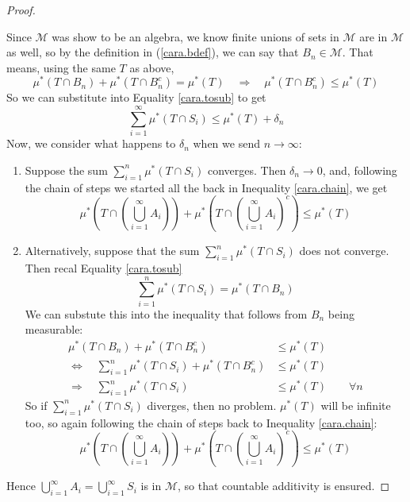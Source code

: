 \documentclass[12pt]{article}
\theoremstyle{plain}
\theoremstyle{definition}
\theoremstyle{remark}
\begin{document}
\begin{proof}
\begin{enumerate}
Since $\mathscr{M}$ was show to be an algebra, we know finite unions of sets in $\mathscr{M}$ are in $\mathscr{M}$ as well, so by the definition in (\ref{cara.bdef}), we can say that $B_n\in\mathscr{M}$. That means, using the same $T$ as above,
\[
    \mu^*(T\cap B_n) + \mu^*(T\cap B_n^c) = \mu^*(T) 
    \quad \Rightarrow\quad
    \mu^*(T\cap B_n^c) \leq \mu^*(T) 
\]
So we can substitute into Equality \ref{cara.tosub} to get 
\[
    \sum^\infty_{i=1}\mu^*(T\cap S_i) \leq \mu^*(T) + \delta_n
\]
Now, we consider what happens to $\delta_n$ when we send $n\rightarrow\infty$:
\begin{enumerate}
\item  Suppose the sum $\sum_{i=1}^n \mu^*(T\cap S_i)$ converges. Then $\delta_n\rightarrow0$, and, following the chain of steps we started all the back in Inequality \ref{cara.chain}, we get 
\[
    \mu^*\left(T \cap \left(\bigcup^\infty_{i=1} A_i
    \right)\right) + 
    \mu^*\left(T \cap \left(\bigcup^\infty_{i=1} A_i
    \right)^c\right) 
    \leq \mu^*(T)
\]
\item Alternatively, suppose that the sum $\sum_{i=1}^n \mu^*(T\cap S_i)$ does not converge. Then recal Equality \ref{cara.tosub}
\[
    \sum_{i=1}^n \mu^*(T\cap S_i) = \mu^*(T\cap B_n)
\]
We can substute this into the inequality that follows from $B_n$ being measurable:
\begin{align*}
    \mu^*(T\cap B_n) + \mu^*(T\cap B_n^c) &\leq \mu^*(T) \\
    \Leftrightarrow \quad
    \sum_{i=1}^n \mu^*(T\cap S_i) + \mu^*(T\cap B_n^c) &\leq \mu^*(T) \\
    \Rightarrow \quad
    \sum_{i=1}^n \mu^*(T\cap S_i) &\leq \mu^*(T) \qquad \forall n
\end{align*}
So if $\sum_{i=1}^n \mu^*(T\cap S_i)$ diverges, then no problem. $\mu^*(T)$ will be infinite too, so again following the chain of steps back to Inequality \ref{cara.chain}:
\[
    \mu^*\left(T \cap \left(\bigcup^\infty_{i=1} A_i
    \right)\right) + 
    \mu^*\left(T \cap \left(\bigcup^\infty_{i=1} A_i
    \right)^c\right) 
    \leq \mu^*(T)
\]
\end{enumerate}
\end{enumerate}
Hence $\bigcup^\infty_{i=1} A_i = \bigcup^\infty_{i=1} S_i$ is in $\mathscr{M}$, so that countable additivity is ensured.

\end{proof}
\end{document}
